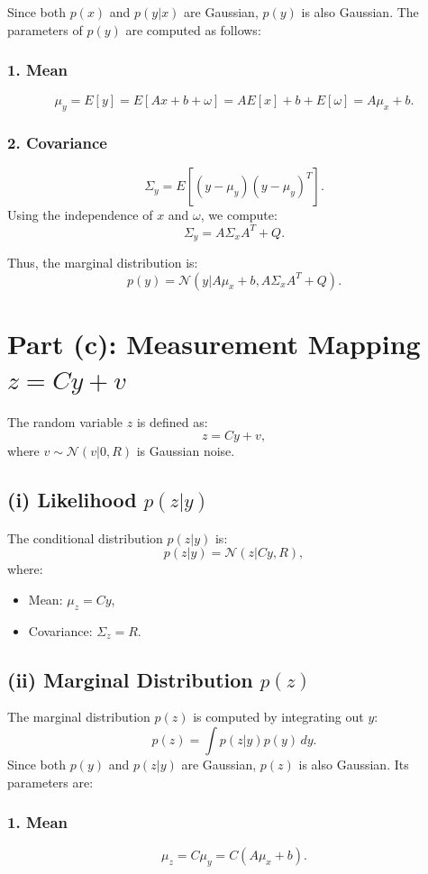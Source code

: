 \documentclass[12pt]{article}
\begin{document}
Since both \( p(x) \) and \( p(y|x) \) are Gaussian, \( p(y) \) is also Gaussian. The parameters of \( p(y) \) are computed as follows:

\subsubsection*{1. Mean}
\[
\mu_y = E[y] = E[A x + b + \omega] = A E[x] + b + E[\omega] = A \mu_x + b.
\]

\subsubsection*{2. Covariance}
\[
\Sigma_y = E[(y - \mu_y)(y - \mu_y)^T].
\]
Using the independence of \( x \) and \( \omega \), we compute:
\[
\Sigma_y = A \Sigma_x A^T + Q.
\]

Thus, the marginal distribution is:
\[
p(y) = \mathcal{N}(y | A \mu_x + b, A \Sigma_x A^T + Q).
\]

\section*{Part (c): Measurement Mapping \( z = C y + v \)}

The random variable \( z \) is defined as:
\[
z = C y + v,
\]
where \( v \sim \mathcal{N}(v | 0, R) \) is Gaussian noise.

\subsection*{(i) Likelihood \( p(z|y) \)}
The conditional distribution \( p(z|y) \) is:
\[
p(z|y) = \mathcal{N}(z | C y, R),
\]
where:
\begin{itemize}
    \item Mean: \( \mu_z = C y \),
    \item Covariance: \( \Sigma_z = R \).
\end{itemize}

\subsection*{(ii) Marginal Distribution \( p(z) \)}
The marginal distribution \( p(z) \) is computed by integrating out \( y \):
\[
p(z) = \int p(z|y) p(y) \, dy.
\]
Since both \( p(y) \) and \( p(z|y) \) are Gaussian, \( p(z) \) is also Gaussian. Its parameters are:

\subsubsection*{1. Mean}
\[
\mu_z = C \mu_y = C (A \mu_x + b).
\]
\end{document}
